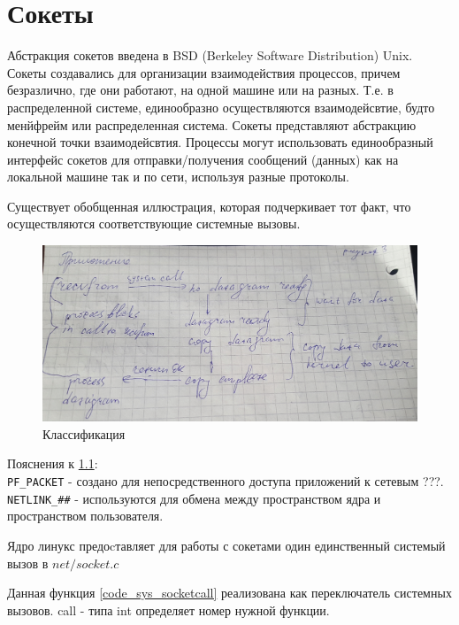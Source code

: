 \chapter{Сокеты}

Абстракция сокетов введена в BSD (Berkeley Software Distribution) Unix. Сокеты создавались для организации взаимодействия процессов, причем безразлично, где они работают, на одной машине или на разных. Т.е. в распределенной системе, единообразно осуществляются взаимодейсвтие, будто менйфрейм или распределенная система. Сокеты представляют абстракцию конечной точки взаимодейсвтия. Процессы могут использовать единообразный интерфейс сокетов для отправки/получения сообщений (данных) как на локальной машине так и по сети, используя разные протоколы. 

Существует обобщенная иллюстрация, которая подчеркивает тот факт, что осуществляются соответствующие системные вызовы.

 

\begin{figure}[H]
  \centering
  \includegraphics[width=\textwidth]{pic/1.png}
  \caption{Классификация}
  \label{pic_class_sockets}
\end{figure}

Пояснения к \ref{pic_class_sockets}:\\ 
\verb|PF_PACKET| - создано для непосредственного доступа приложений к сетевым ???. \\
\verb|NETLINK_##| - используются для обмена между пространством ядра и пространством пользователя.

Ядро линукс предоcтавляет для работы с сокетами один единственный системый вызов в $net/socket.c$

 

Данная функция \ref{code_sys_socketcall} реализована как переключатель системных вызовов. 
call - типа int определяет номер нужной функции.

